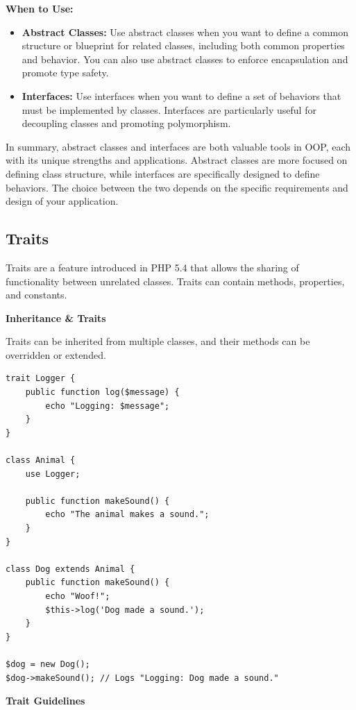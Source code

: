 \documentclass[11pt]{article}
\begin{document}
\textbf{When to Use:}

\begin{itemize}
\item \textbf{Abstract Classes:} Use abstract classes when you want to define a
common structure or blueprint for related classes, including both
common properties and behavior. You can also use abstract classes to
enforce encapsulation and promote type safety.

\item \textbf{Interfaces:} Use interfaces when you want to define a set of
behaviors that must be implemented by classes. Interfaces are
particularly useful for decoupling classes and promoting polymorphism.
\end{itemize}

In summary, abstract classes and interfaces are both valuable tools in
OOP, each with its unique strengths and applications. Abstract classes
are more focused on defining class structure, while interfaces are
specifically designed to define behaviors. The choice between the two
depends on the specific requirements and design of your application.

\subsection{\textbf{Traits}}
\label{sec:orgf949904}
Traits are a feature introduced in PHP 5.4 that allows the sharing of
functionality between unrelated classes. Traits can contain methods,
properties, and constants.

\textbf{Inheritance \& Traits}

Traits can be inherited from multiple classes, and their methods can be
overridden or extended.

\begin{verbatim}
trait Logger {
    public function log($message) {
        echo "Logging: $message";
    }
}

class Animal {
    use Logger;

    public function makeSound() {
        echo "The animal makes a sound.";
    }
}

class Dog extends Animal {
    public function makeSound() {
        echo "Woof!";
        $this->log('Dog made a sound.');
    }
}

$dog = new Dog();
$dog->makeSound(); // Logs "Logging: Dog made a sound."
\end{verbatim}

\textbf{Trait Guidelines}
\end{document}
